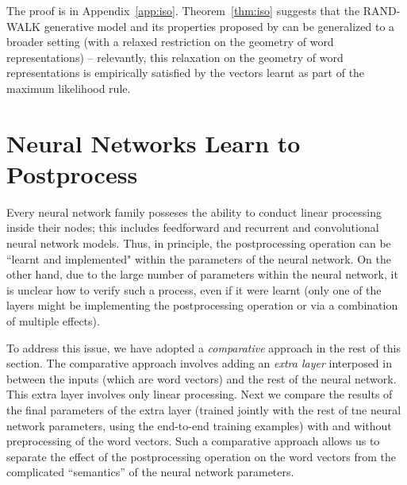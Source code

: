 \documentclass{article} \usepackage{acl2017,times}
\begin{document}
The proof is in Appendix~\ref{app:iso}. Theorem~\ref{thm:iso} suggests that the RAND-WALK generative model and its properties proposed by \citep{arora2015rand} can be generalized to a broader setting (with a relaxed restriction on the geometry of word representations) -- relevantly, this relaxation on the geometry of word representations is empirically satisfied by the vectors learnt as part of the maximum likelihood rule. 



{
\section{Neural Networks Learn to Postprocess}
\label{app:neuralnet}


Every neural network family  posseses the ability to  conduct linear processing inside their nodes; this includes feedforward and recurrent and  convolutional neural network models. Thus, in principle, the  postprocessing operation  can be  ``learnt and implemented"  
within  the parameters of the neural network. On the other hand, due to the large number of parameters within the neural network, it is unclear how to verify such a process, even if it were learnt (only one of the layers might be implementing the postprocessing operation or via a combination of multiple effects). 


To address this issue, we have adopted a {\em comparative} approach  in the rest of this section. The comparative approach involves adding an {\em extra layer} interposed in between the inputs (which are word vectors) and the  rest of the neural network. This extra layer involves only linear processing. Next we compare the results of the  final  
parameters  of the extra layer  (trained jointly  with the rest of tne neural network parameters, using the end-to-end training examples) with and without  preprocessing of the  word vectors.  Such a comparative approach  allows us to separate the effect of the  postprocessing operation on the  word vectors  from the complicated ``semantics'' of the neural network parameters. 
 


}
\end{document}
